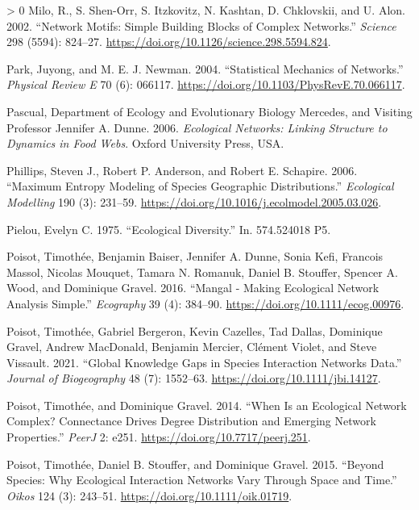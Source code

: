 \documentclass[11pt]{article}
\newlength{\cslhangindent}
\newenvironment{CSLReferences}[3] %
 {%
  \setlength{\parindent}{0pt}
  \ifodd #1 \everypar{\setlength{\hangindent}{\cslhangindent}}\ignorespaces\fi
  \ifnum #2 > 0
  \setlength{\parskip}{#2\baselineskip}
  \fi
 }%
 {}
\begin{document}
\begin{CSLReferences}{1}{0}
\leavevmode\hypertarget{ref-Milo2002NetMot}{}%
Milo, R., S. Shen-Orr, S. Itzkovitz, N. Kashtan, D. Chklovskii, and U.
Alon. 2002. {``Network Motifs: Simple Building Blocks of Complex
Networks.''} \emph{Science} 298 (5594): 824--27.
\url{https://doi.org/10.1126/science.298.5594.824}.

\leavevmode\hypertarget{ref-Park2004StaMeca}{}%
Park, Juyong, and M. E. J. Newman. 2004. {``Statistical Mechanics of
Networks.''} \emph{Physical Review E} 70 (6): 066117.
\url{https://doi.org/10.1103/PhysRevE.70.066117}.

\leavevmode\hypertarget{ref-Pascual2006EcoNeta}{}%
Pascual, Department of Ecology and Evolutionary Biology Mercedes, and
Visiting Professor Jennifer A. Dunne. 2006. \emph{Ecological Networks:
Linking Structure to Dynamics in Food Webs}. Oxford University Press,
USA.

\leavevmode\hypertarget{ref-Phillips2006MaxEnta}{}%
Phillips, Steven J., Robert P. Anderson, and Robert E. Schapire. 2006.
{``Maximum Entropy Modeling of Species Geographic Distributions.''}
\emph{Ecological Modelling} 190 (3): 231--59.
\url{https://doi.org/10.1016/j.ecolmodel.2005.03.026}.

\leavevmode\hypertarget{ref-Pielou1975EcoDiv}{}%
Pielou, Evelyn C. 1975. {``Ecological Diversity.''} In. 574.524018 P5.

\leavevmode\hypertarget{ref-Poisot2016ManMakb}{}%
Poisot, Timothée, Benjamin Baiser, Jennifer A. Dunne, Sonia Kefi,
Francois Massol, Nicolas Mouquet, Tamara N. Romanuk, Daniel B. Stouffer,
Spencer A. Wood, and Dominique Gravel. 2016. {``Mangal - Making
Ecological Network Analysis Simple.''} \emph{Ecography} 39 (4): 384--90.
\url{https://doi.org/10.1111/ecog.00976}.

\leavevmode\hypertarget{ref-Poisot2021GloKno}{}%
Poisot, Timothée, Gabriel Bergeron, Kevin Cazelles, Tad Dallas,
Dominique Gravel, Andrew MacDonald, Benjamin Mercier, Clément Violet,
and Steve Vissault. 2021. {``Global Knowledge Gaps in Species
Interaction Networks Data.''} \emph{Journal of Biogeography} 48 (7):
1552--63. \url{https://doi.org/10.1111/jbi.14127}.

\leavevmode\hypertarget{ref-Poisot2014WheEcoa}{}%
Poisot, Timothée, and Dominique Gravel. 2014. {``When Is an Ecological
Network Complex? Connectance Drives Degree Distribution and Emerging
Network Properties.''} \emph{PeerJ} 2: e251.
\url{https://doi.org/10.7717/peerj.251}.

\leavevmode\hypertarget{ref-Poisot2015SpeWhya}{}%
Poisot, Timothée, Daniel B. Stouffer, and Dominique Gravel. 2015.
{``Beyond Species: Why Ecological Interaction Networks Vary Through
Space and Time.''} \emph{Oikos} 124 (3): 243--51.
\url{https://doi.org/10.1111/oik.01719}.


\end{CSLReferences}
\end{document}
